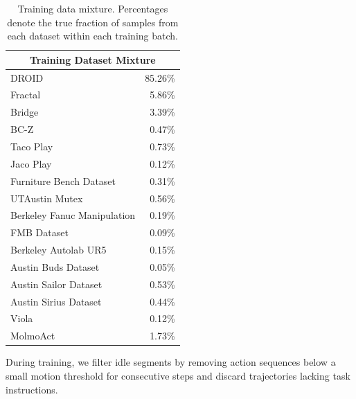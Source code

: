 \begin{table}[th]
    \centering
    \caption{Training data mixture. Percentages denote the true fraction of samples from each dataset within each training batch.}
    
    \begin{tabular}{lr}
        \toprule
        \multicolumn{2}{c}{\textbf{Training Dataset Mixture}}\\
        \midrule
        DROID \cite{khazatsky2025droidlargescaleinthewildrobot} & 85.26\% \\
        Fractal \cite{brohan2023rt1roboticstransformerrealworld} & 5.86\% \\
        Bridge \cite{walke2024bridgedatav2datasetrobot} & 3.39\% \\
        BC-Z \cite{pmlr-v164-jang22a} & 0.47\% \\
        Taco Play \cite{mees2023groundinglanguagevisualaffordances} & 0.73\% \\
        Jaco Play \cite{dass2023jacoplay} & 0.12\% \\
        Furniture Bench Dataset \cite{heo2023furniturebenchreproduciblerealworldbenchmark} & 0.31\% \\
        UTAustin Mutex \cite{shah2023mutex} & 0.56\% \\
        Berkeley Fanuc Manipulation \cite{zhu2023fanuc} & 0.19\% \\
        FMB Dataset \cite{luo2024fmbfunctionalmanipulationbenchmark} & 0.09\% \\
        Berkeley Autolab UR5 \cite{BerkeleyUR5Website} & 0.15\% \\
        Austin Buds Dataset \cite{zhu2022bottomupskilldiscoveryunsegmented} & 0.05\% \\
        Austin Sailor Dataset \cite{nasiriany2022sailor} & 0.53\% \\
        Austin Sirius Dataset \cite{liu2023robotlearningjobhumanintheloop} & 0.44\% \\
        Viola \cite{zhu2023violaimitationlearningvisionbased} & 0.12\% \\
        MolmoAct \cite{lee2025molmoactactionreasoningmodels} & 1.73\% \\
        \bottomrule
    \end{tabular}
    \label{tab:data_mix}
\end{table}


During training, we filter idle segments by removing action sequences below a small motion threshold for consecutive steps and discard trajectories lacking task instructions.

